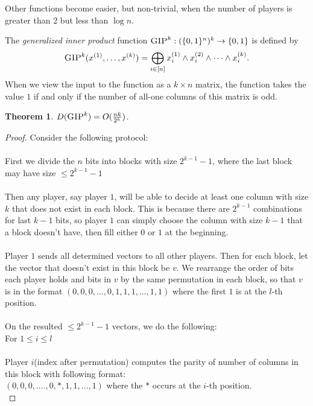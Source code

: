 \documentclass[11pt,oneside]{book}
\theoremstyle{plain}
\newtheorem{theorem}{Theorem}
\theoremstyle{definition}
\theoremstyle{plain}
\newcommand{\GIP}{\textsc{GIP}}
\begin{document}
	Other functions become easier, but non-trivial, when the number of players is greater than 2 but less than $\log n$.
	
	The \emph{generalized inner product} function $\GIP^k : (\{0,1\}^n)^k \to \{0,1\}$ is defined by
	\[
	\GIP^k(x^{(1)},\ldots,x^{(k)}) = \bigoplus_{i \in [n]} x^{(1)}_i \wedge x^{(2)}_i \wedge \cdots \wedge x^{(k)}_i.
	\]
	When we view the input to the function as a $k \times n$ matrix, the function takes the value $1$ if and only if the number of all-one columns of this matrix is odd. 
	
	\begin{theorem}
		$D(\GIP^k) = O(\frac{nk}{2^k})$.
	\end{theorem}
	
	\begin{proof}
		Consider the following protocol:\\
		\\
		First we divide the $n$ bits into blocks with size $2^{k-1}-1$, where the last block may have size $
		\leq 2^{k-1}-1$\\
		\\
		Then any player, say player $1$, will be able to decide at least one column with size $k$ that does not exist in each block.
		This is because there are $2^{k-1}$ combinations for last $k-1$ bits, so player $1$ can simply choose the column with size $k-1$ that a block doesn't have, then fill either $0$ or $1$ at the beginning.\\
		\\
		Player $1$ sends all determined vectors to all other players. Then for each block, let the vector that doesn't exist in this block be $v$. We rearrange the order of bits each player holds and bits in $v$ by the same permutation in each block, so that $v$ is in the format $(0,0,0,...,0,1,1,1,...,1,1)$ where the first $1$ is at the $l$-th position.\\
		\\
		On the resulted $\leq 2^{k-1}-1$ vectors, we do the following:\\
		For $1 \leq i \leq l$\\
		\\
		\hspace*{10mm}Player $i$(index after permutation) computes the parity of number of columns in this block with following format:\\
		\hspace*{20mm}$(0,0,0,....,0,*,1,1,...,1)$ where the $*$ occurs at the $i$-th position.\\

\end{proof}
\end{document}
